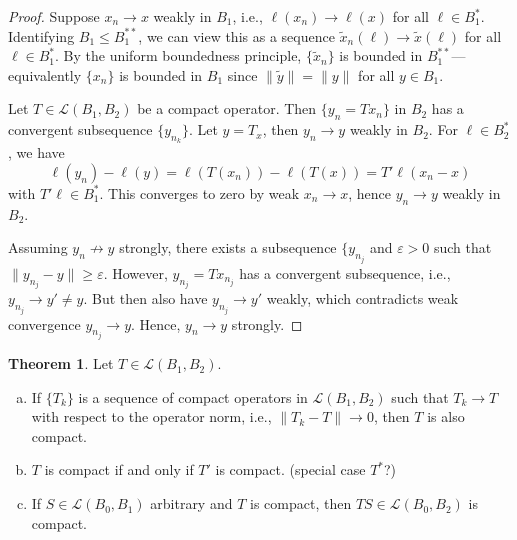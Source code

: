 \documentclass[12pt]{article}
\theoremstyle{definition}
\newtheorem{theorem}{Theorem}
\newcommand{\LL}{\mathcal{L}}
\newcommand{\eps}{\varepsilon}
\newcommand{\<}{\left\langle}
\renewcommand{\>}{\right\rangle}
\begin{document}
\begin{proof}
    Suppose $x_n \to x$ weakly in $B_1$, i.e., $\ell(x_n) \to \ell(x)$ for all $\ell \in B_1^*$.
    Identifying $B_1 \leq B_1^{**}$, we can view this as a sequence $\tilde{x}_n(\ell) \to \tilde{x}(\ell)$ for all $\ell \in B_1^*$.
    By the uniform boundedness principle, $\{\tilde{x}_n\}$ is bounded in $B_1^{**}$---equivalently $\{x_n\}$ is bounded in $B_1$ since $\|\tilde{y}\| = \|y\|$ for all $y \in B_1$.

    Let $T \in \LL(B_1, B_2)$ be a compact operator.
    Then $\{y_n = Tx_n\}$ in $B_2$ has a convergent subsequence $\{y_{n_k}\}$.
    Let $y = T_x$, then $y_n \to y$ weakly in $B_2$.
    For $\ell \in B_2^*$, we have
    \[
        \ell(y_n) - \ell(y)
            = \ell(T(x_n)) - \ell(T(x))
            = T'\ell(x_n - x)
    \]
    with $T'\ell \in B_1^*$.
    This converges to zero by weak $x_n \to x$, hence $y_n \to y$ weakly in $B_2$.

    Assuming $y_n \not\to y$ strongly, there exists a subsequence $\{y_{n_j}$ and $\eps > 0$ such that $\|y_{n_j} - y\| \geq \eps$.
    However, $y_{n_j} = Tx_{n_j}$ has a convergent subsequence, i.e., $y_{n_j} \to y' \ne y$.
    But then also have $y_{n_j} \to y'$ weakly, which contradicts weak convergence $y_{n_j} \to y$.
    Hence, $y_n \to y$ strongly.
\end{proof}

\begin{theorem}
    Let $T \in \LL(B_1, B_2)$.
    \begin{enumerate}[(a)]
        \item If $\{T_k\}$ is a sequence of compact operators in $\LL(B_1, B_2)$ such that $T_k \to T$ with respect to the operator norm, i.e., $\|T_k - T\| \to 0$, then $T$ is also compact.
        \item $T$ is compact if and only if $T'$ is compact. (special case $T^*$?)
        \item If $S \in \LL(B_0, B_1)$ arbitrary and $T$ is compact, then $TS \in \LL(B_0, B_2)$ is compact.
    \end{enumerate}
\end{theorem}
\end{document}
